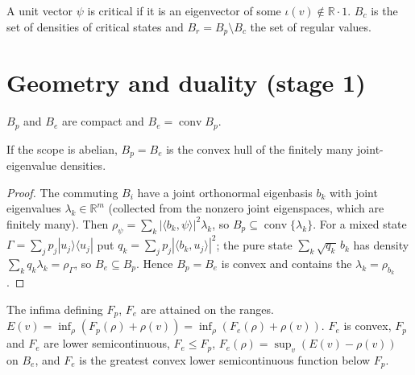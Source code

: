 \begin{definition}\label{def:scope-critical}
  \leanok
  A unit vector $\psi$ is critical if it is an eigenvector of some $\iota(v)\notin\mathbb R\cdot1$. $B_c$ is the set of densities of
  critical states and $B_r=B_p\setminus B_c$ the set of regular values.
\end{definition}

\section{Geometry and duality (stage 1)}

\begin{theorem}\label{thm:scope-ranges}
  \leanok
  $B_p$ and $B_e$ are compact and $B_e=\operatorname{conv}B_p$.
\end{theorem}

\begin{theorem}\label{thm:scope-ranges-abelian}
  \leanok
  If the scope is abelian, $B_p=B_e$ is the convex hull of the finitely many joint-eigenvalue densities.
\end{theorem}

\begin{proof}
  \leanok
  The commuting $B_i$ have a joint orthonormal eigenbasis $b_k$ with joint eigenvalues $\lambda_k\in\mathbb R^m$ (collected from the
  nonzero joint eigenspaces, which are finitely many). Then $\rho_\psi=\sum_k|\langle b_k,\psi\rangle|^2\lambda_k$, so
  $B_p\subseteq\operatorname{conv}\{\lambda_k\}$. For a mixed state $\Gamma=\sum_jp_j|u_j\rangle\langle u_j|$ put
  $q_k=\sum_jp_j|\langle b_k,u_j\rangle|^2$; the pure state $\sum_k\sqrt{q_k}\,b_k$ has density $\sum_kq_k\lambda_k=\rho_\Gamma$, so
  $B_e\subseteq B_p$. Hence $B_p=B_e$ is convex and contains the $\lambda_k=\rho_{b_k}$.
\end{proof}

\begin{theorem}\label{thm:scope-functionals}
  \leanok
  The infima defining $F_p$, $F_e$ are attained on the ranges. $E(v)=\inf_\rho(F_p(\rho)+\rho(v))=\inf_\rho(F_e(\rho)+\rho(v))$.
  $F_e$ is convex, $F_p$ and $F_e$ are lower semicontinuous, $F_e\le F_p$, $F_e(\rho)=\sup_v(E(v)-\rho(v))$ on $B_e$, and $F_e$ is
  the greatest convex lower semicontinuous function below $F_p$.
\end{theorem}

